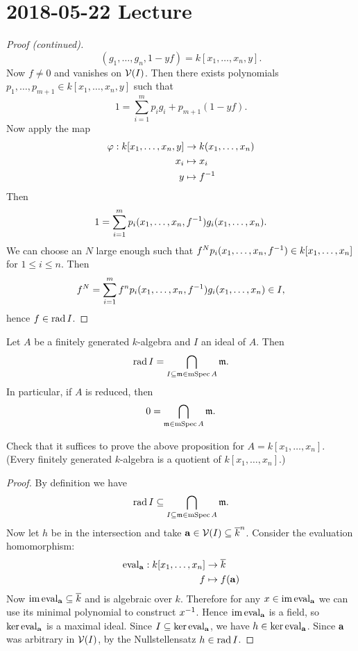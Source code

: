 \section{2018-05-22 Lecture}

\begin{proof}[Proof (continued)]
  \[ (g_1,\ldots,g_n,1-yf) = k[x_1,\ldots,x_n,y]. \]
  Now $f \neq 0$ and vanishes on $\mathcal{V}(I)$.
  Then there exists polynomials $p_1,\ldots,p_{m+1} \in k[x_1,\ldots,x_n,y]$ such that
  \[ 1 = \sum_{i=1}^m p_ig_i + p_{m+1}(1-yf). \]
  Now apply the map
  \begin{align*}
    \varphi: k[x_1,\ldots,x_n,y] &\to k(x_1,\ldots,x_n) \\
    x_i &\mapsto x_i \\
    y &\mapsto f^{-1}
  \end{align*}
  Then
  \[ 1 = \sum_{i=1}^m p_i(x_1,\ldots,x_n,f^{-1}) g_i(x_1,\ldots,x_n). \]
  We can choose an $N$ large enough such that $f^Np_i(x_1,\ldots,x_n,f^{-1}) \in k[x_1,\ldots,x_n]$ for $1 \leq i \leq n$.
  Then
  \[ f^N = \sum_{i=1}^m f^n p_i(x_1,\ldots,x_n,f^{-1}) g_i(x_1,\ldots,x_n) \in I, \]
  hence $f \in \operatorname{rad} I$.
\end{proof}

\begin{prop}[3.30]
  Let $A$ be a finitely generated $k$-algebra and $I$ an ideal of $A$.
  Then
  \[ \operatorname{rad} I = \bigcap_{I \subseteq \mathfrak{m} \in \operatorname{mSpec} A} \mathfrak{m}. \]
  In particular, if $A$ is reduced, then
  \[ 0 = \bigcap_{\mathfrak{m} \in \operatorname{mSpec} A} \mathfrak{m}. \]
\end{prop}

\begin{exer}
  Check that it suffices to prove the above proposition for $A=k[x_1,\ldots,x_n]$.
  (Every finitely generated $k$-algebra is a quotient of $k[x_1,\ldots,x_n]$.)
\end{exer}

\begin{proof}
  By definition we have
  \[ \operatorname{rad} I \subseteq \bigcap_{ I \subseteq \mathfrak{m} \in \operatorname{mSpec} A } \mathfrak{m}. \]
  Now let $h$ be in the intersection and take $\mathbf{a} \in \mathcal{V}(I) \subseteq \overline k^n$.
  Consider the evaluation homomorphism:
  \begin{align*}
    \operatorname{eval}_{\mathbf{a}}: k[x_1,\ldots,x_n] &\to \overline k \\
    f &\mapsto f(\mathbf{a})
  \end{align*}
  Now $\operatorname{im} \operatorname{eval}_{\mathbf{a}} \subseteq \overline k$ and is algebraic over $k$.
  Therefore for any $x \in \operatorname{im}\operatorname{eval}_{\mathbf{a}}$ we can use its minimal polynomial to construct $x^{-1}$.
  Hence $\operatorname{im} \operatorname{eval}_{\mathbf{a}}$ is a field, so $\ker\operatorname{eval}_{\mathbf{a}}$ is a maximal ideal.
  Since $I \subseteq \ker\operatorname{eval}_{\mathbf{a}}$, we have $h \in \ker\operatorname{eval}_{\mathbf{a}}$.
  Since $\mathbf{a}$ was arbitrary in $\mathcal{V}(I)$, by the Nullstellensatz $h \in \operatorname{rad} I$.
\end{proof}

